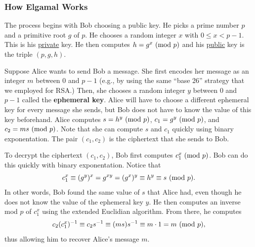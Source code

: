 \documentclass[letterpaper]{article}
\begin{document}
\subsubsection{How Elgamal Works}
The process begins with Bob choosing a public key. He picks a prime number $p$ and a primitive root $g$ of $p$. He chooses a random integer $x$ with $0 \leq x < p - 1$. This is his \underline{private} key. He then computes $h = g^x \ (\mathrm{mod}\ p)$ and his \underline{public} key is the triple $(p, g, h)$. 

\bigskip 

Suppose Alice wants to send Bob a message. She first encodes her message as an integer $m$ between $0$ and $p - 1$ (e.g., by using the same ``base 26'' strategy that we employed for RSA.) Then, she chooses a random integer $y$ between $0$ and $p - 1$ called the \textbf{ephemeral key}. Alice will have to choose a different ephemeral key for every message she sends, but Bob does not have to know the value of this key beforehand. Alice computes $s = h^y \ (\mathrm{mod}\ p)$, $c_1 = g^y \ (\mathrm{mod}\ p)$, and $c_2 = ms \ (\mathrm{mod}\ p)$. Note that she can compute $s$ and $c_1$ quickly using binary exponentation. The pair $(c_1, c_2)$ is the ciphertext that she sends to Bob. 

\bigskip 

To decrypt the ciphertext $(c_1, c_2)$, Bob first computes $c_1^x \ (\mathrm{mod}\ p)$. Bob can do this quickly with binary exponentation. Notice that 
\[c_1^x \equiv (g^y)^x = g^{xy} = (g^x)^y \equiv h^y \equiv s \ (\mathrm{mod}\ p).\]
In other words, Bob found the same value of $s$ that Alice had, even though he does not know the value of the ephemeral key $y$. He then computes an inverse mod $p$ of $c_1^x$ using the extended Euclidian algorithm. From there, he computes 
\[c_2 (c_1^x)^{-1} \equiv c_2 s^{-1} \equiv (ms)s^{-1} \equiv m \cdot 1 = m \ (\mathrm{mod}\ p),\]
thus allowing him to recover Alice's message $m$.
\end{document}
